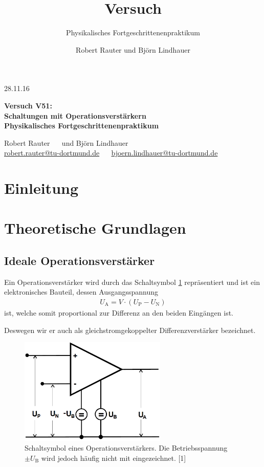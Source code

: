 \documentclass[]{scrartcl}
\title{Versuch \versuchnummer\\ \versuchname}
\subtitle{Physikalisches Fortgeschrittenenpraktikum}
\author{Robert Rauter und Björn Lindhauer}
\date{\versuchdatum}
\newcommand{\versuchnummer}{V51}
\newcommand{\versuchname}{Schaltungen mit Operationsverstärkern}
\newcommand{\versuchdatum}{28.11.16}
\begin{document}
\begin{titlepage}
{\large \versuchdatum}
\vspace{7cm}
\begin{center}
\textbf{\huge Versuch \versuchnummer:}\\
\vspace{0.5cm}
\textbf{\huge \versuchname}\\
\vspace{0.2cm}
\textbf{ Physikalisches Fortgeschrittenenpraktikum}\\
\vspace{9cm}

{\Large Robert Rauter \ \ \hspace{1.5cm} und \hspace{1.5cm} Björn Lindhauer}\\
{ \url{robert.rauter@tu-dortmund.de} \ \ \hspace{2cm} \url{bjoern.lindhauer@tu-dortmund.de}}
\end{center}
\end{titlepage}
\section{Einleitung}

\section{Theoretische Grundlagen}
\subsection{Ideale Operationsverstärker}
Ein Operationsverstärker wird durch das Schaltsymbol \ref{fig:schaltsymbol_operationsverstaerker} repräsentiert und ist ein elektronisches Bauteil, dessen Ausgangsspannung
\begin{align}
 U_{\text{A}}=V\cdot \left( U_{\text{P}}-U_{\text{N}} \right)
\end{align}
ist, welche somit proportional zur Differenz an den beiden Eingängen ist.

Deswegen wir er auch als gleichstromgekoppelter Differenzverstärker bezeichnet.

\begin{figure}[H]
\centering
\includegraphics[width=7cm]{images/schaltsymbol_operationsverstaerker.png}
\caption{Schaltsymbol eines Operationsverstärkers. Die Betriebsspannung $\pm U_{\text{B}}$ wird jedoch häufig nicht mit eingezeichnet. [1]}
\label{fig:schaltsymbol_operationsverstaerker}
\end{figure}
\end{document}

